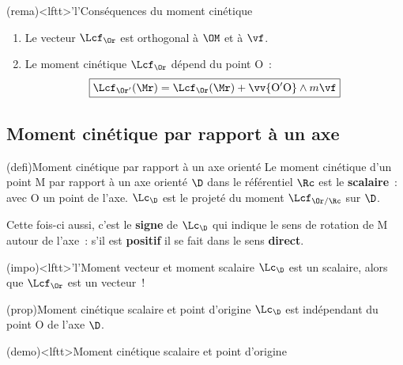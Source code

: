 \documentclass[../../main/main.tex]{subfiles}
\begin{document}
\begin{tcb*}(rema)<lftt>'l'{Conséquences du moment cinétique}
	\begin{enumerate}
		\item Le vecteur $\Lcf_{\Or}$ est orthogonal à $\OM$ et à $\vf$.
		\item Le moment cinétique $\Lcf_{\Or}$ dépend du point O~:
		      \[
			      \boxed{\Lcf_{\Or'}(\Mr) = \Lcf_{\Or}(\Mr) + \vv{\rm O'O}\wedge
				      m\vf}
		      \]
	\end{enumerate}
\end{tcb*}

\subsection{Moment cinétique par rapport à un axe }
\begin{tcb*}[sidebyside, righthand ratio=.2](defi){Moment cinétique par rapport
			à un axe orienté}
	Le moment cinétique d'un point M par rapport à un axe orienté $\D$
	dans le référentiel $\Rc$ est le \textbf{scalaire}~:
	\psw{
		\[
			\boxed{\Lc_{\D}(\Mr) = (\OM\wedge\pf_{\Mr/\Rc})\cdot\ud =
				\Lcf_{\Or/\Rc}(\Mr)\cdot\ud}
		\]
	}%
	avec O un point de l'axe. $\Lc_{\D}$ est le projeté du moment
	$\Lcf_{\Or/\Rc}$ sur $\D$.
	\tcblower
	\psw{
		\[
			\si{J.s}
		\]
	}
\end{tcb*}

Cette fois-ci aussi, c'est le \textbf{signe} de $\Lc_{\D}$ qui indique le sens de
rotation de M autour de l'axe~: s'il est \textbf{positif} il se fait dans le
sens \textbf{direct}.

\begin{tcb*}(impo)<lftt>'l'{Moment vecteur et moment scalaire}
	$\Lc_{\D}$ est un scalaire, alors que $\Lcf_{\Or}$ est un vecteur~!
\end{tcb*}

\begin{tcb*}[cnt](prop){Moment cinétique scalaire et point d'origine}
	$\Lc_{\D}$ est indépendant du point O de l'axe $\D$.
\end{tcb*}
\begin{tcb*}(demo)<lftt>{Moment cinétique scalaire et point d'origine}
	\psw{
		\[
			\Lcf_{\mathrm{O'}/\Rc}\cdot\ud =
			\left[(\vv{\rm O'O}+\OM)\wedge\pf_{\Mr/\Rc}\right]\cdot\ud =
			\underbracket[1pt]{
				(\underbracket[1pt]{\vv{\rm O'O}}_{\parr\ud}\wedge\pf_{\Mr/\Rc})
				\cdot\ud}_{=0}
			+ \Lcf_{\Or/\Rc}\cdot\ud = \Lcf_{\Or/\Rc}\cdot\ud
		\]
	}
	\vspace{-15pt}
\end{tcb*}
\end{document}

